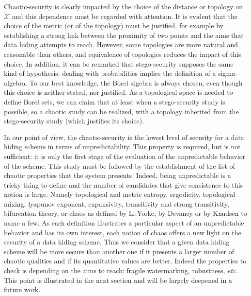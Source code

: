 \documentclass{llncs}
\begin{document}
Chaotic-security is clearly impacted by the choice of the distance or topology on $\mathcal{X}$ and this dependence must be regarded with attention. It is evident that the choice of the metric (or of the topology) must be justified, for example by establishing a strong link between the proximity of two points and the aims that data hiding attempts to reach.
However, some topologies are more natural and reasonable than others, and equivalence of topologies reduces the impact of this choice. In addition, it can be remarked that stego-security supposes the same kind of hypothesis: dealing with probabilities implies the definition of a sigma-algebra. To our best knowledge, the Borel algebra is always chosen, even though this choice is neither stated, nor justified. As a topological space is needed to define Borel sets, we can claim that at least when a stego-security study is possible, so a chaotic study can be realized, with a topology inherited from the stego-security study (which justifies its choice). 



\medskip

In our point of view, the chaotic-security is the lowest level of security for a data hiding scheme in terms of unpredictability. This property is required, but is not sufficient: it is only the first stage of the evaluation of the unpredictable behavior of the scheme. This study must be followed by the establishment of the list of chaotic properties that the system presents. Indeed, being unpredictable is a tricky thing to define and the number of candidates that give consistence to this notion is large. Namely topological and metric entropy, ergodicity, topological mixing, lyapunov exponent, expansivity, transitivity and strong transitivity, bifurcation theory, or chaos as defined by Li-Yorke, by Devaney or by Knudsen to name a few. As each definition illustrates a particular aspect of an unpredictable behavior and has its own interest, each notion of chaos offers a new light on the security of a data hiding scheme. Thus we consider that a given data hiding scheme will be more secure than another one if it presents a larger number of chaotic qualities and if its quantitative values are better. Indeed the properties to check is depending on the aims to reach: fragile watermarking, robustness, \emph{etc.} This point is illustrated in the next section and will be largely deepened in a future work. 
\end{document}
